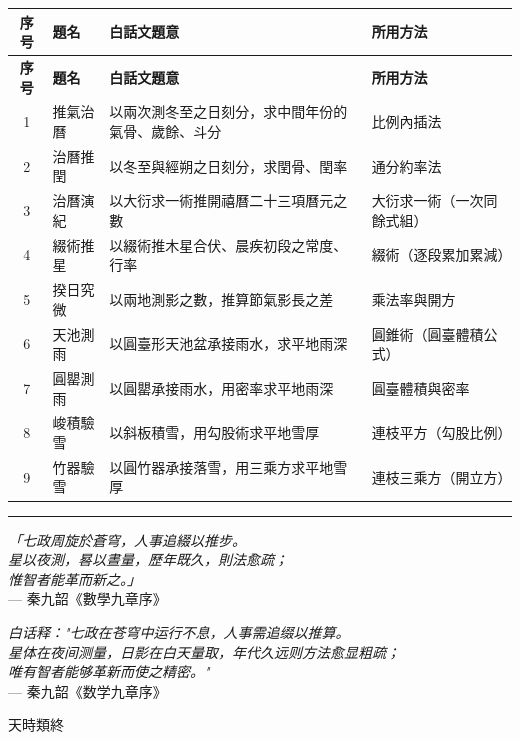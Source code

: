 \documentclass[11pt,a4paper]{book}
\newcommand{\longline}{\noindent\rule{\textwidth}{0.4pt}}
\begin{document}
\begin{longtable}{|c|l|p{5cm}|p{6cm}|}
\hline
\textbf{序号} & \textbf{題名} & \textbf{白話文題意} & \textbf{所用方法} \\
\hline
\endfirsthead
\hline
\textbf{序号} & \textbf{題名} & \textbf{白話文題意} & \textbf{所用方法} \\
\hline
\endhead
1 & 推氣治曆 & 以兩次測冬至之日刻分，求中間年份的氣骨、歲餘、斗分 & 比例內插法 \\
\hline
2 & 治曆推閏 & 以冬至與經朔之日刻分，求閏骨、閏率 & 通分約率法 \\
\hline
3 & 治曆演紀 & 以大衍求一術推開禧曆二十三項曆元之數 & 大衍求一術（一次同餘式組） \\
\hline
4 & 綴術推星 & 以綴術推木星合伏、晨疾初段之常度、行率 & 綴術（逐段累加累減） \\
\hline
5 & 揆日究微 & 以兩地測影之數，推算節氣影長之差 & 乘法率與開方 \\
\hline
6 & 天池測雨 & 以圓臺形天池盆承接雨水，求平地雨深 & 圓錐術（圓臺體積公式） \\
\hline
7 & 圓罌測雨 & 以圓罌承接雨水，用密率求平地雨深 & 圓臺體積與密率 \\
\hline
8 & 峻積驗雪 & 以斜板積雪，用勾股術求平地雪厚 & 連枝平方（勾股比例） \\
\hline
9 & 竹器驗雪 & 以圓竹器承接落雪，用三乘方求平地雪厚 & 連枝三乘方（開立方） \\
\hline
\end{longtable}

\vspace{1.5cm}

\begin{center}
\longline

\vspace{0.5cm}

{\small\color{origcolor}
\textit{「七政周旋於蒼穹，人事追綴以推步。\\
星以夜測，晷以晝量，歷年既久，則法愈疏；\\
惟智者能革而新之。」}\\
--- 秦九韶《數學九章序》}

\vspace{0.5cm}

{\small\color{modcolor}
\textit{白话释："七政在苍穹中运行不息，人事需追缀以推算。\\
星体在夜间测量，日影在白天量取，年代久远则方法愈显粗疏；\\
唯有智者能够革新而使之精密。"}\\
--- 秦九韶《数学九章序》}

\vspace{0.5cm}

{\small 天時類終}

\end{center}
\end{document}
